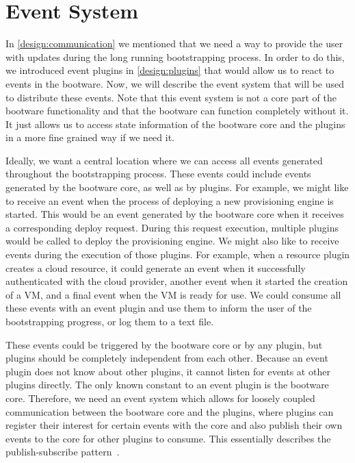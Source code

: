 \section{Event System}
\label{design:internalcomm}

In \autoref{design:communication} we mentioned that we need a way to provide the user with updates during the long running bootstrapping process.
In order to do this, we introduced event plugins in \autoref{design:plugins} that would allow us to react to events in the bootware.
Now, we will describe the event system that will be used to distribute these events.
Note that this event system is not a core part of the bootware functionality and that the bootware can function completely without it.
It just allows us to access state information of the bootware core and the plugins in a more fine grained way if we need it.

Ideally, we want a central location where we can access all events generated throughout the bootstrapping process.
These events could include events generated by the bootware core, as well as by plugins.
For example, we might like to receive an event when the process of deploying a new provisioning engine is started.
This would be an event generated by the bootware core when it receives a corresponding deploy request.
During this request execution, multiple plugins would be called to deploy the provisioning engine.
We might also like to receive events during the execution of those plugins.
For example, when a resource plugin creates a cloud resource, it could generate an event when it successfully authenticated with the cloud provider, another event when it started the creation of a VM, and a final event when the VM is ready for use.
We could consume all these events with an event plugin and use them to inform the user of the bootstrapping progress, or log them to a text file.

These events could be triggered by the bootware core or by any plugin, but plugins should be completely independent from each other.
Because an event plugin does not know about other plugins, it cannot listen for events at other plugins directly.
The only known constant to an event plugin is the bootware core.
Therefore, we need an event system which allows for loosely coupled communication between the bootware core and the plugins, where plugins can register their interest for certain events with the core and also publish their own events to the core for other plugins to consume.
This essentially describes the publish-subscribe pattern~\autocite{pubsub}.

